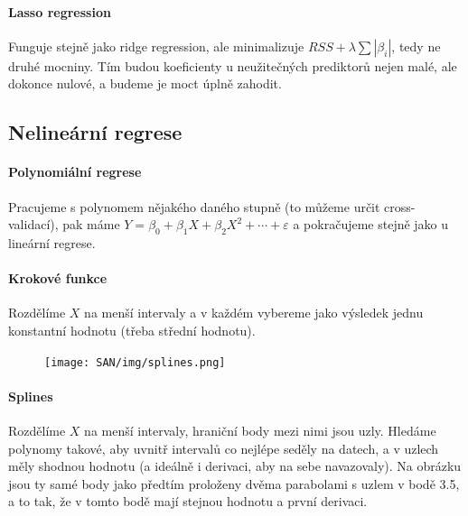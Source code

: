 \paragraph{Lasso regression} Funguje stejně jako ridge regression, ale minimalizuje $RSS + \lambda\sum|\beta_i|$, tedy ne druhé mocniny. Tím budou koeficienty u neužitečných prediktorů nejen malé, ale dokonce nulové, a budeme je moct úplně zahodit.

\subsection{Nelineární regrese}

\paragraph{Polynomiální regrese} Pracujeme s polynomem nějakého daného stupně (to můžeme určit cross-validací), pak máme $Y = \beta_0 + \beta_1 X + \beta_2 X^2 + \cdots + \varepsilon$ a pokračujeme stejně jako u lineární regrese.

\paragraph{Krokové funkce} Rozdělíme $X$ na menší intervaly a v každém vybereme jako výsledek jednu konstantní hodnotu (třeba střední hodnotu). 

\begin{figure}[ht!]
\centering
\texttt{[image: SAN/img/splines.png]}
\end{figure}

\paragraph{Splines} Rozdělíme $X$ na menší intervaly, hraniční body mezi nimi jsou uzly. Hledáme polynomy takové, aby uvnitř intervalů co nejlépe seděly na datech, a v uzlech měly shodnou hodnotu  (a ideálně i derivaci, aby na sebe navazovaly). Na obrázku jsou ty samé body jako předtím proloženy dvěma parabolami s uzlem v bodě 3.5, a to tak, že v tomto bodě mají stejnou hodnotu a první derivaci.

